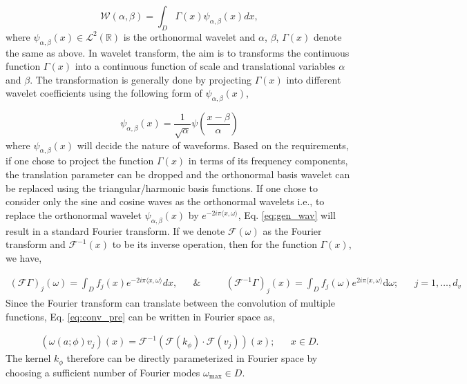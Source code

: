 \documentclass{article}
\begin{document}
\begin{equation}\label{eq:gen_wav}
\mathcal{W}(\alpha, \beta) = \int_{D} \Gamma(x) \psi_{\alpha, \beta}(x) dx,
\end{equation}
where $\psi_{\alpha,\beta}(x) \in \mathcal{L}^2(\mathbb{R})$ is the orthonormal wavelet and $\alpha$, $\beta$, $\Gamma(x)$ denote the same as above. In wavelet transform, the aim is to transforms the continuous function $\Gamma (x)$ into a continuous function of scale and translational variables $\alpha$ and $\beta$. The transformation is generally done by projecting $\Gamma (x)$ into different wavelet coefficients using the following form of $\psi_{\alpha,\beta}(x)$, 

\begin{equation}
\psi_{\alpha, \beta}(x) = \frac{1}{\sqrt{\alpha}} \psi\left(\frac{x-\beta}{\alpha}\right)
\end{equation}
where $\psi_{\alpha, \beta}(x)$ will decide the nature of waveforms. Based on the requirements, if one chose to project the function $\Gamma (x)$ in terms of its frequency components, the translation parameter can be dropped and the orthonormal basis wavelet can be replaced using the triangular/harmonic basis functions. If one chose to consider only the sine and cosine waves as the orthonormal wavelets i.e., to replace the orthonormal wavelet $\psi_{\alpha,\beta}(x)$ by $e^{-2 i \pi\langle x, \omega\rangle}$, Eq. \eqref{eq:gen_wav} will result in a standard Fourier transform. If we denote $\mathcal{F}(\omega)$ as the Fourier transform and $\mathcal{F}^{-1}(x)$ to be its inverse operation, then for the function $\Gamma (x)$, we have,

\begin{equation}
    \begin{aligned}
        (\mathcal{F} \Gamma)_{j}(\omega)=\int_{D} f_{j}(x) e^{-2 i \pi\langle x, \omega \rangle} dx, && \& && \quad\left(\mathcal{F}^{-1} \Gamma \right)_{j}(x)=\int_{D} f_{j}(\omega) e^{2 i \pi\langle x, \omega \rangle} \mathrm{d} \omega; &&  j=1, \ldots, d_{v}
    \end{aligned}
\end{equation}
Since the Fourier transform can translate between the convolution of multiple functions, Eq. \eqref{eq:conv_pre} can be written in Fourier space as,

\begin{equation}
    \begin{aligned}
        \left(\mathcal{\omega}(a ; \phi) v_{j}\right)(x)=\mathcal{F}^{-1}\left(\mathcal{F}(k_{\phi}) \cdot \mathcal{F}(v_{j})\right)(x);  && x \in D.
    \end{aligned}
\end{equation}
The kernel $k_{\phi}$ therefore can be directly parameterized in Fourier space by choosing a sufficient number of Fourier modes $\omega_{\max} \in D$.
\end{document}
